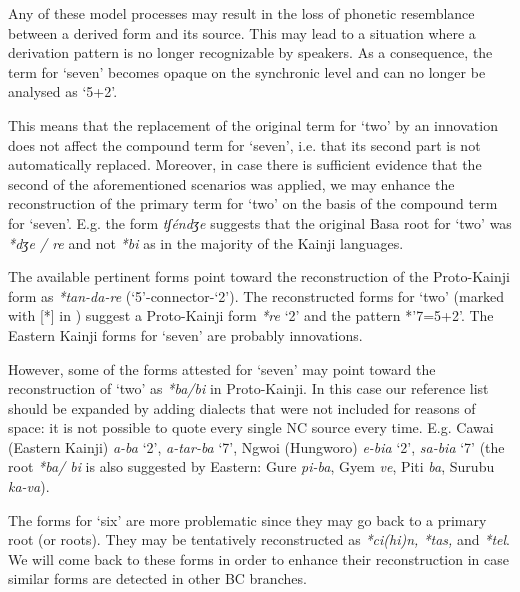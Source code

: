 \newpage 
Any of these model processes may result in the loss of phonetic resemblance between a derived form and its source. This may lead to a situation where a derivation pattern is no longer recognizable by speakers. As a consequence, the term for ‘seven’ becomes opaque on the synchronic level and can no longer be analysed as ‘5+2’.

This means that the replacement of the original term for ‘two’ by an innovation does not affect the compound term for ‘seven’, i.e. that its second part is not automatically replaced. Moreover, in case there is sufficient evidence that the second of the aforementioned scenarios was applied, we may enhance the reconstruction of the primary term for ‘two’ on the basis of the compound term for ‘seven’. E.g. the form \textit{tʃéndʒe} suggests that the original Basa root for ‘two’ was \textit{*dʒe / re} and not \textit{*bi} as in the majority of the Kainji languages.

The available pertinent forms point toward the reconstruction of the Proto-Kainji form as  \textit{*tan-da-re} (‘5’-connector-‘2’). The reconstructed forms for ‘two’ (marked with [*] in ) suggest a Proto-Kainji form \textit{*re} ‘2’ and the pattern *’7=5+2’. The Eastern Kainji forms for ‘seven’ are probably innovations.

However, some of the forms attested for ‘seven’ may point toward the reconstruction of ‘two’ as \textit{*ba/bi} in Proto-Kainji. In this case our reference list should be expanded by adding dialects that were not included for reasons of space: it is not possible to quote every single NC source every time. E.g. Cawai (Eastern Kainji) \textit{a-ba} ‘2’, \textit{a-tar-ba} ‘7’, Ngwoi (Hungworo) \textit{e-bia} ‘2’, \textit{sa-bia} ‘7’ (the root \textit{*ba/ bi} is also suggested by Eastern: Gure \textit{pi-ba}, Gyem \textit{ve}, Piti \textit{ba}, Surubu \textit{ka-va}).

The forms  for ‘six’ are more problematic since they may go back to a primary root (or roots). They may be tentatively reconstructed as \textit{*ci(hi)n, *tas,} and \textit{*tel}. We will come back to these forms in order to enhance their reconstruction in case similar forms are detected in other BC branches. 

